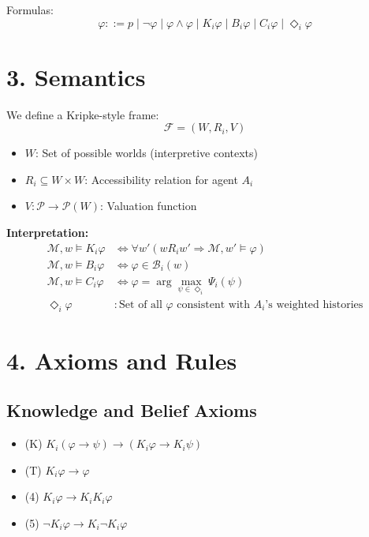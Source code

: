\documentclass{article}
\begin{document}
Formulas:
\[
\varphi ::= p \mid \neg \varphi \mid \varphi \wedge \varphi \mid K_i \varphi \mid B_i \varphi \mid C_i \varphi \mid \Diamond_i \varphi
\]

\section*{3. Semantics}
We define a Kripke-style frame:
\[
\mathcal{F} = (W, R_i, V)
\]
\begin{itemize}
  \item \( W \): Set of possible worlds (interpretive contexts)
  \item \( R_i \subseteq W \times W \): Accessibility relation for agent \( A_i \)
  \item \( V: \mathcal{P} \to \mathcal{P}(W) \): Valuation function
\end{itemize}

\textbf{Interpretation:}
\begin{align*}
  \mathcal{M}, w \models K_i \varphi &\iff \forall w' (w R_i w' \Rightarrow \mathcal{M}, w' \models \varphi) \\
  \mathcal{M}, w \models B_i \varphi &\iff \varphi \in \mathcal{B}_i(w) \\
  \mathcal{M}, w \models C_i \varphi &\iff \varphi = \arg\max_{\psi \in \Diamond_i} \Psi_i(\psi) \\
  \Diamond_i \varphi &: \text{Set of all } \varphi \text{ consistent with } A_i\text{'s weighted histories}
\end{align*}

\section*{4. Axioms and Rules}
\subsection*{Knowledge and Belief Axioms}
\begin{itemize}
  \item (K) \( K_i(\varphi \rightarrow \psi) \rightarrow (K_i \varphi \rightarrow K_i \psi) \)
  \item (T) \( K_i \varphi \rightarrow \varphi \)
  \item (4) \( K_i \varphi \rightarrow K_i K_i \varphi \)
  \item (5) \( \neg K_i \varphi \rightarrow K_i \neg K_i \varphi \)
\end{itemize}
\end{document}
